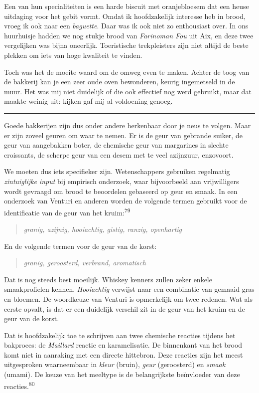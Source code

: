 \documentclass[
  11pt,
  dutch,
]{memoir}
\begin{document}
Een van hun specialiteiten is een harde biscuit met oranjebloesem dat
een heuse uitdaging voor het gebit vormt. Omdat ik hoofdzakelijk
interesse heb in brood, vroeg ik ook naar een \emph{baguette}. Daar was
ik ook niet zo enthousiast over. In ons huurhuisje hadden we nog stukje
brood van \emph{Farinoman Fou} uit Aix, en deze twee vergelijken was
bijna oneerlijk. Toeristische trekpleisters zijn niet altijd de beste
plekken om iets van hoge kwaliteit te vinden.

Toch was het de moeite waard om de omweg even te maken. Achter de toog
van de bakkerij kan je een zeer oude oven bewonderen, keurig ingemetseld
in de muur. Het was mij niet duidelijk of die ook effectief nog werd
gebruikt, maar dat maakte weinig uit: kijken gaf mij al voldoening
genoeg.

\pfbreak

Goede bakkerijen zijn dus onder andere herkenbaar door je neus te
volgen. Maar er zijn zoveel geuren om waar te nemen. Er is de geur van
gebrande suiker, de geur van aangebakken boter, de chemische geur van
margarines in slechte croissants, de scherpe geur van een desem met te
veel azijnzuur, enzovoort.

We moeten dus iets specifieker zijn. Wetenschappers gebruiken regelmatig
\emph{zintuiglijke input} bij empirisch onderzoek, waar bijvoorbeeld aan
vrijwilligers wordt gevraagd om brood te beoordelen gebaseerd op geur en
smaak. In een onderzoek van Venturi en anderen worden de volgende termen
gebruikt voor de identificatie van de geur van het
kruim:\textsuperscript{79}

\begin{quote}
\emph{granig, azijnig, hooiachtig, gistig, ranzig, openhartig}
\end{quote}

En de volgende termen voor de geur van de korst:

\begin{quote}
\emph{granig, geroosterd, verbrand, aromatisch}
\end{quote}

Dat is nog steeds best moeilijk. Whiskey kenners zullen zeker enkele
smaakprofielen kennen. \emph{Hooiachtig} verwijst naar een combinatie
van gemaaid gras en bloemen. De woordkeuze van Venturi is opmerkelijk om
twee redenen. Wat als eerste opvalt, is dat er een duidelijk verschil
zit in de geur van het kruim en de geur van de korst.

Dat is hoofdzakelijk toe te schrijven aan twee chemische reacties
tijdens het bakproces: de \emph{Maillard} reactie en karamelisatie. De
binnenkant van het brood komt niet in aanraking met een directe
hittebron. Deze reacties zijn het meest uitgesproken waarneembaar in
\emph{kleur} (bruin), \emph{geur} (geroosterd) en \emph{smaak} (umami).
De keuze van het meeltype is de belangrijkste beïnvloeder van deze
reacties.\textsuperscript{80}
\end{document}
